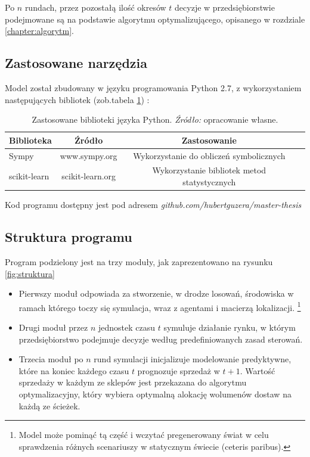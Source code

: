 \documentclass[polish, twoside, 12pt, a4paper]{article}
\theoremstyle{definition}
\theoremstyle{plain}
\theoremstyle{remark}
\begin{document}
Po $n$ rundach, przez pozostałą ilość okresów $t$ decyzje w przedsiębiorstwie podejmowane są na podstawie algorytmu optymalizującego, opisanego w rozdziale \ref{chapter:algorytm}. 

\subsection{Zastosowane narzędzia}

Model został zbudowany w języku programowania Python 2.7, z wykorzystaniem następujących bibliotek (zob.tabela \ref{tab:biblioteki}) : 

\begin{table}[hbt]
  \centering
  \captionsetup{margin=10pt,font=small,labelfont=bf,width=.8\textwidth}
  \caption[Zastosowane biblioteki języka Python]{Zastosowane biblioteki języka Python. \textit{Źródło:} opracowanie własne.}
  \label{tab:biblioteki}
\vspace*{2ex}
  \begin{tabular}{lccc}
 Biblioteka & Źródło & Zastosowanie \\ 
\hline
 Sympy & www.sympy.org & Wykorzystanie do obliczeń symbolicznych \\  
 scikit-learn & scikit-learn.org & Wykorzystanie bibliotek metod statystycznych \\ \hline
  \end{tabular}
\end{table}


Kod programu dostępny jest pod adresem  \textit{github.com/hubertguzera/master-thesis}

\subsection{Struktura programu}

Program podzielony jest na trzy moduły, jak zaprezentowano na rysunku \ref{fig:struktura}

	\begin{itemize}
		\item Pierwszy moduł odpowiada za stworzenie, w drodze losowań, środowiska w ramach którego toczy się symulacja, wraz z agentami i macierzą lokalizacji. \footnote{Model może pominąć tą część i wczytać pregenerowany świat w celu sprawdzenia różnych scenariuszy w statycznym świecie (ceteris paribus).}
		\item  Drugi moduł przez $n$ jednostek czasu $t$ symuluje działanie rynku, w którym przedsiębiorstwo podejmuje decyzje według predefiniowanych zasad sterowań.
		\item Trzecia moduł po $n$ rund symulacji inicjalizuje modelowanie predyktywne, które na koniec każdego czasu $t$ prognozuje sprzedaż w $t+1$. Wartość sprzedaży w każdym ze sklepów jest przekazana do algorytmu optymalizacyjny, który wybiera optymalną alokację wolumenów dostaw na każdą ze ścieżek. 
	\end{itemize}
\end{document}

